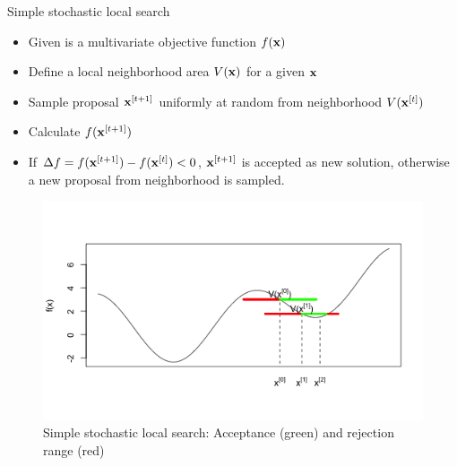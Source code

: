 \documentclass[11pt,compress,t,notes=noshow, xcolor=table]{beamer}
\begin{document}
\begin{vbframe}{Simple stochastic local search}
\vspace{-0.2cm}
\begin{small}
\begin{itemize}
\item Given is a multivariate objective function $f(\mathbf{x})$
\item Define a local neighborhood area $V(\mathbf{x})$ for a given $\mathbf{x}$
\item Sample proposal $\mathbf{x}^{[t+1]}$ uniformly at random from neighborhood $V(\mathbf{x}^{[t]})$
\item Calculate $f(\mathbf{x}^{[t+1]})$
\item If $\Delta f = f(\mathbf{x}^{[t+1]}) - f(\mathbf{x}^{[t]}) < 0$, $\mathbf{x}^{[t+1]}$ is accepted as new solution, otherwise a new proposal from neighborhood is sampled.
\end{itemize}
\end{small}

\vspace{-\baselineskip}

\begin{figure}
    \centering
    \includegraphics[height=0.4\textheight,keepaspectratio]{figure_man/metropolis-local-search.png}
    \caption*{
        \footnotesize
        Simple stochastic local search: Acceptance (green) and rejection range (red)}
\end{figure}
\vspace{-0.5cm}



\end{vbframe}
\end{document}
